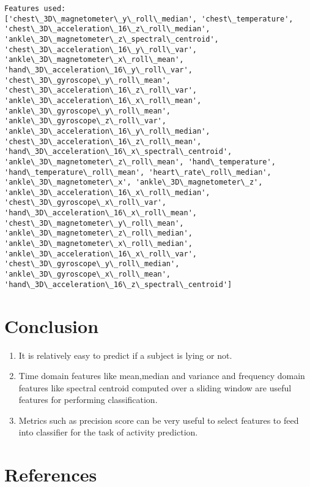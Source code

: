 \documentclass[11pt]{article}
\begin{document}
    \begin{Verbatim}[commandchars=\\\{\}]
Features used:
['chest\_3D\_magnetometer\_y\_roll\_median', 'chest\_temperature',
'chest\_3D\_acceleration\_16\_z\_roll\_median',
'ankle\_3D\_magnetometer\_z\_spectral\_centroid',
'chest\_3D\_acceleration\_16\_y\_roll\_var', 'ankle\_3D\_magnetometer\_x\_roll\_mean',
'hand\_3D\_acceleration\_16\_y\_roll\_var', 'chest\_3D\_gyroscope\_y\_roll\_mean',
'chest\_3D\_acceleration\_16\_z\_roll\_var', 'ankle\_3D\_acceleration\_16\_x\_roll\_mean',
'ankle\_3D\_gyroscope\_y\_roll\_mean', 'ankle\_3D\_gyroscope\_z\_roll\_var',
'ankle\_3D\_acceleration\_16\_y\_roll\_median',
'chest\_3D\_acceleration\_16\_z\_roll\_mean',
'hand\_3D\_acceleration\_16\_x\_spectral\_centroid',
'ankle\_3D\_magnetometer\_z\_roll\_mean', 'hand\_temperature',
'hand\_temperature\_roll\_mean', 'heart\_rate\_roll\_median',
'ankle\_3D\_magnetometer\_x', 'ankle\_3D\_magnetometer\_z',
'ankle\_3D\_acceleration\_16\_x\_roll\_median', 'chest\_3D\_gyroscope\_x\_roll\_var',
'hand\_3D\_acceleration\_16\_x\_roll\_mean', 'chest\_3D\_magnetometer\_y\_roll\_mean',
'ankle\_3D\_magnetometer\_z\_roll\_median', 'ankle\_3D\_magnetometer\_x\_roll\_median',
'ankle\_3D\_acceleration\_16\_x\_roll\_var', 'chest\_3D\_gyroscope\_y\_roll\_median',
'ankle\_3D\_gyroscope\_x\_roll\_mean', 'hand\_3D\_acceleration\_16\_z\_spectral\_centroid']
    \end{Verbatim}

    \hypertarget{conclusion}{%
\section{Conclusion}\label{conclusion}}

\begin{enumerate}
\def\labelenumi{\arabic{enumi}.}
\item
  It is relatively easy to predict if a subject is lying or not.
\item
  Time domain features like mean,median and variance and frequency
  domain features like spectral centroid computed over a sliding window
  are useful features for performing classification.
\item
  Metrics such as precision score can be very useful to select features
  to feed into classifier for the task of activity prediction.
\end{enumerate}

    \hypertarget{references}{%
\section{References}\label{references}}
\end{document}
